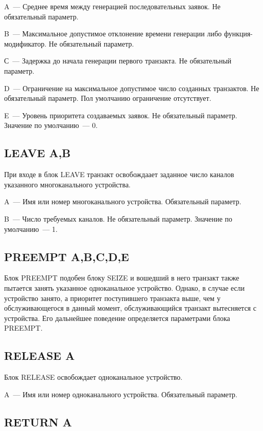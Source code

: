 A~--- Среднее время между генерацией последовательных заявок. Не обязательный параметр.

B~--- Максимальное допустимое отклонение времени генерации либо функция-модификатор. Не обязательный параметр.

С~--- Задержка до начала генерации первого транзакта. Не обязательный параметр.

D~--- Ограничение на максимальное допустимое число созданных транзактов. Не обязательный параметр. Пол умолчанию ограничение отсутствует.

E~--- Уровень приоритета создаваемых заявок. Не обязательный параметр. Значение по умолчанию~--- 0.

\subsection*{LEAVE A,B}

При входе в блок LEAVE транзакт освобождаает заданное число каналов указанного многоканального устройства.

A~--- Имя или номер многоканального устройства. Обязательный параметр.

B~--- Число требуемых каналов. Не обязательный параметр. Значение по умолчанию~--- 1.

\subsection*{PREEMPT A,B,C,D,E}

Блок PREEMPT подобен блоку SEIZE и вошедший в него транзакт также пытается занять указанное одноканальное устройство. Однако, в случае если устройство занято, а приоритет поступившего транзакта выше, чем у обслуживающегося в данный момент, обслуживающийся транзакт вытесняется с устройства. Его дальнейшее поведение определяется параметрами блока PREEMPT.

\subsection*{RELEASE A}

Блок RELEASE освобождает одноканальное устройство.

A~--- Имя или номер одноканального устройства. Обязательный параметр.

\subsection*{RETURN A}

